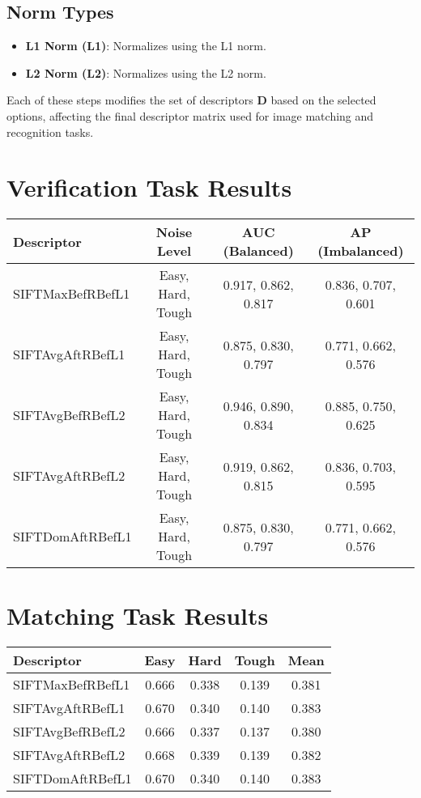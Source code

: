 \subsection*{Norm Types}

\begin{itemize}
    \item \textbf{L1 Norm (L1)}: Normalizes using the L1 norm.
    \item \textbf{L2 Norm (L2)}: Normalizes using the L2 norm.
\end{itemize}

Each of these steps modifies the set of descriptors $\mathbf{D}$ based on the selected options, affecting the final descriptor matrix used for image matching and recognition tasks.


\section*{Verification Task Results}

\begin{tabular}{lccc}
\toprule
\textbf{Descriptor} & \textbf{Noise Level} & \textbf{AUC (Balanced)} & \textbf{AP (Imbalanced)} \\
\midrule
SIFTMaxBefRBefL1 & Easy, Hard, Tough & 0.917, 0.862, 0.817 & 0.836, 0.707, 0.601 \\
SIFTAvgAftRBefL1 & Easy, Hard, Tough & 0.875, 0.830, 0.797 & 0.771, 0.662, 0.576 \\
SIFTAvgBefRBefL2 & Easy, Hard, Tough & 0.946, 0.890, 0.834 & 0.885, 0.750, 0.625 \\
SIFTAvgAftRBefL2 & Easy, Hard, Tough & 0.919, 0.862, 0.815 & 0.836, 0.703, 0.595 \\
SIFTDomAftRBefL1 & Easy, Hard, Tough & 0.875, 0.830, 0.797 & 0.771, 0.662, 0.576 \\
\bottomrule
\end{tabular}

\section*{Matching Task Results}

\begin{tabular}{lcccc}
\toprule
\textbf{Descriptor} & \textbf{Easy} & \textbf{Hard} & \textbf{Tough} & \textbf{Mean} \\
\midrule
SIFTMaxBefRBefL1 & 0.666 & 0.338 & 0.139 & 0.381 \\
SIFTAvgAftRBefL1 & 0.670 & 0.340 & 0.140 & 0.383 \\
SIFTAvgBefRBefL2 & 0.666 & 0.337 & 0.137 & 0.380 \\
SIFTAvgAftRBefL2 & 0.668 & 0.339 & 0.139 & 0.382 \\
SIFTDomAftRBefL1 & 0.670 & 0.340 & 0.140 & 0.383 \\
\bottomrule
\end{tabular}


